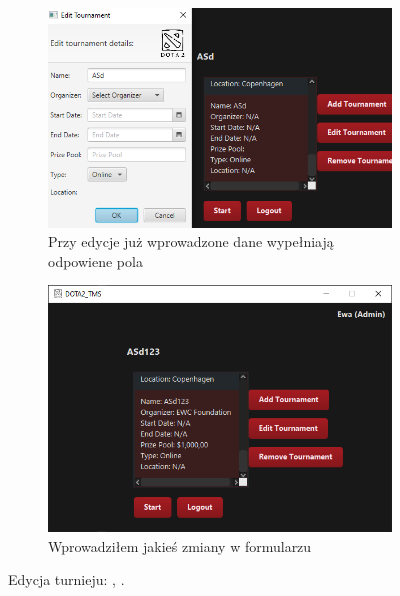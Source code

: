 \begin{figure}[H]
    \begin{subfigure}{0.6\textwidth}
        \centering
        \includegraphics[width=.8\linewidth]{figures/Edit.png}
        \caption{Przy edycje już wprowadzone dane wypełniają odpowiene pola \label{subfigure_name}}
    \end{subfigure}
    \begin{subfigure}{0.6\textwidth}
        \centering
        \includegraphics[width=.8\linewidth]{figures/Edited.png}
        \caption{Wprowadziłem jakieś zmiany w formularzu \label{fig:tournament_selection_fxml_edit}}
    \end{subfigure}
    \caption{Edycja turnieju: \protect{}, \protect{}. \label{fig:tournament_selection_fxml_edit_form}}
\end{figure}
